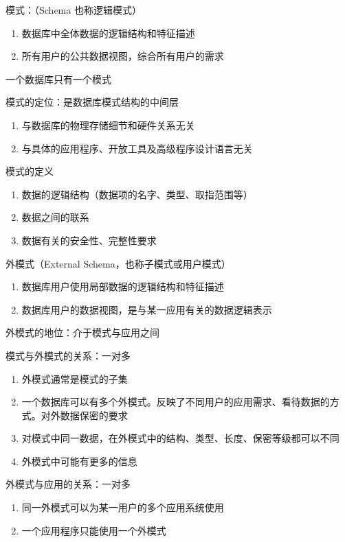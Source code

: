 \documentclass{article}
\begin{document}
模式：（Schema 也称逻辑模式）

\begin{enumerate}
    \item 数据库中全体数据的逻辑结构和特征描述
    \item 所有用户的公共数据视图，综合所有用户的需求
\end{enumerate}

一个数据库只有一个模式

模式的定位：是数据库模式结构的中间层
\begin{enumerate}
    \item 与数据库的物理存储细节和硬件关系无关
    \item 与具体的应用程序、开放工具及高级程序设计语言无关
\end{enumerate}

模式的定义
\begin{enumerate}
    \item 数据的逻辑结构（数据项的名字、类型、取指范围等）
    \item 数据之间的联系
    \item 数据有关的安全性、完整性要求
\end{enumerate}

外模式（External Schema，也称子模式或用户模式）
\begin{enumerate}
    \item 数据库用户使用局部数据的逻辑结构和特征描述
    \item 数据库用户的数据视图，是与某一应用有关的数据逻辑表示
\end{enumerate}

外模式的地位：介于模式与应用之间

模式与外模式的关系：一对多
\begin{enumerate}
    \item 外模式通常是模式的子集
    \item 一个数据库可以有多个外模式。反映了不同用户的应用需求、看待数据的方式。对外数据保密的要求
    \item 对模式中同一数据，在外模式中的结构、类型、长度、保密等级都可以不同
    \item 外模式中可能有更多的信息
\end{enumerate}

外模式与应用的关系：一对多
\begin{enumerate}
    \item 同一外模式可以为某一用户的多个应用系统使用
    \item 一个应用程序只能使用一个外模式
\end{enumerate}
\end{document}
